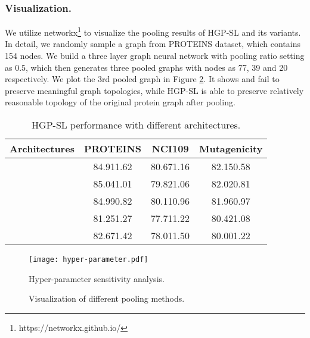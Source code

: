 \documentclass[letterpaper]{article} \usepackage{aaai20}  \usepackage{times}  \usepackage{helvet} \usepackage{courier}  \usepackage[hyphens]{url}  \usepackage{graphicx} \urlstyle{rm} \def\UrlFont{\rm}  \usepackage{graphicx}  \frenchspacing  \setlength{\pdfpagewidth}{8.5in}  \setlength{\pdfpageheight}{11in}
\begin{document}
\subsubsection{Visualization.}
We utilize networkx\footnote{https://networkx.github.io/} to visualize the pooling results of HGP-SL and its variants. In detail, we randomly sample a graph from PROTEINS dataset, which contains 154 nodes. We build a three layer graph neural network with pooling ratio setting as 0.5, which then generates three pooled graphs with nodes as 77, 39 and 20 respectively. We plot the 3rd pooled graph in Figure \ref{fig:visualization}. It shows  and  fail to preserve meaningful graph topologies, while HGP-SL is able to preserve relatively reasonable topology of the original protein graph after pooling.

\begin{table}[t]
    \centering
    \small
    \begin{tabular}{lccc}
    \hline
    Architectures  				  	& PROTEINS			& NCI109			& Mutagenicity		\\
    \hline	
      	& 84.911.62 	& 80.671.16	& 82.150.58 	\\
      	& 85.041.01	& 79.821.06	& 82.020.81	\\
     	& 84.990.82    & 80.110.96 	& 81.960.97	\\
    \hline
     				& 81.251.27    & 77.711.22 	& 80.421.08	\\
     			& 82.671.42 	& 78.011.50	& 80.001.22	\\
    \hline
    \end{tabular}
    \caption{HGP-SL performance with different architectures.}
    \label{tab:result_architecture}
\end{table}

\begin{figure}
  \centering
  \texttt{[image: hyper-parameter.pdf]}
  \caption{Hyper-parameter sensitivity analysis.}
  \label{fig:hyper_parameter}
\end{figure}

\begin{figure}[!htb]\small
\centering
{}
\caption{Visualization of different pooling methods.}
\label{fig:visualization}
\end{figure} 
\end{document}
